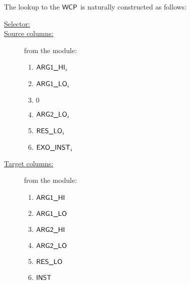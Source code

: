 The lookup to the $\textsf{WCP}$ is naturally constructed as follows:

\begin{description}
	\item[\underline{Selector:}] \wcpLookupFlag{}
	\item[\underline{Source columns:}] from the \stpMod{} module:
	\begin{multicols}{3}
	\begin{enumerate}
		\item $\textsf{ARG}\textsf{1}\textsf{\_HI}_{i}$
		\item $\textsf{ARG}\textsf{1}\textsf{\_LO}_{i}$
		\item $0$
		\item $\textsf{ARG}\textsf{2}\textsf{\_LO}_{i}$
		\item $\textsf{RES}\textsf{\_LO}_{i}$
	 	\item $\textsf{EXO\_INST}_{i}$
	\end{enumerate}
	\end{multicols}
\item[\underline{Target columns:}] from the \wcpMod{} module: 
	\begin{multicols}{3}
	\begin{enumerate}
		\item $\textsf{ARG}\textsf{1}\textsf{\_HI}$
		\item $\textsf{ARG}\textsf{1}\textsf{\_LO}$
	        \item $\textsf{ARG}\textsf{2}\textsf{\_HI}$
		\item $\textsf{ARG}\textsf{2}\textsf{\_LO}$
		\item $\textsf{RES}\textsf{\_LO}$
		\item $\textsf{INST}$
	\end{enumerate} 
	\end{multicols}
\end{description}
